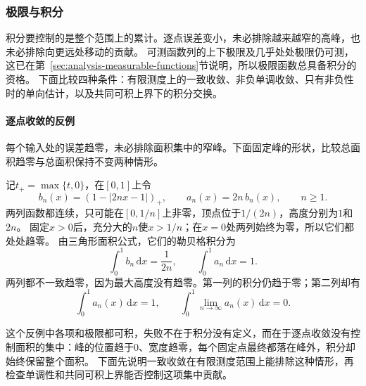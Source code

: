 \subsubsection{极限与积分}

积分要控制的是整个范围上的累计。逐点误差变小，未必排除越来越窄的高峰，也未必排除向更远处移动的贡献。
可测函数列的上下极限及几乎处处极限仍可测，这已在第~\ref{sec:analysis-measurable-functions}节说明，所以极限函数总具备积分的资格。
下面比较四种条件：有限测度上的一致收敛、非负单调收敛、只有非负性时的单向估计，以及共同可积上界下的积分交换。

\paragraph{逐点收敛的反例}
每个输入处的误差趋零，未必排除面积集中的窄峰。下面固定峰的形状，比较总面积趋零与总面积保持不变两种情形。
\begin{example}[连续尖峰逐点趋零而积分不趋零]
\label{ex:analysis-continuous-spikes}
记$t_+=\max\{t,0\}$，在$[0,1]$上令
\begin{equation}
 b_n(x)=(1-|2nx-1|)_+,\qquad a_n(x)=2n\,b_n(x),\qquad n\geq1.
\label{eq:measurable-continuous-spikes}
\end{equation}
两列函数都连续，只可能在$[0,1/n]$上非零，顶点位于$1/(2n)$，高度分别为$1$和$2n$。
固定$x>0$后，充分大的$n$使$x>1/n$；在$x=0$处两列始终为零，所以它们都处处趋零。
由三角形面积公式，它们的勒贝格积分为
\[
 \int_0^1b_n\,\mathrm dx=\frac1{2n},\qquad \int_0^1a_n\,\mathrm dx=1.
\]
两列都不一致趋零，因为最大高度没有趋零。第一列的积分仍趋于零；第二列却有
\begin{equation}
 \int_0^1a_n(x)\,\mathrm dx=1,
 \qquad \int_0^1\lim_{n\to\infty}a_n(x)\,\mathrm dx=0.
\label{eq:analysis-continuous-spike-integral-failure}
\end{equation}
\end{example}
这个反例中各项和极限都可积，失败不在于积分没有定义，而在于逐点收敛没有控制面积的集中：峰的位置趋于$0$、宽度趋零，每个固定点最终都落在峰外，积分却始终保留整个面积。
下面先说明一致收敛在有限测度范围上能排除这种情形，再检查单调性和共同可积上界能否控制这项集中贡献。


